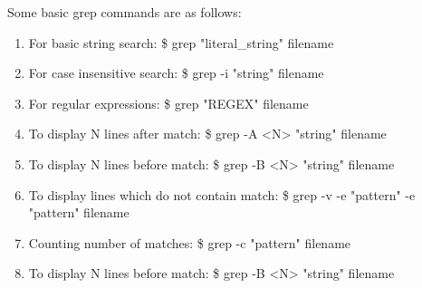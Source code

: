 \documentclass{beamer}
\begin{document}
\begin{frame}

Some basic grep commands are as follows:
\begin{enumerate}
    \item
        For basic string search:
            \$ grep "literal\_string" filename
    \item
        For case insensitive search:
            \$ grep -i "string" filename
    \item
        For regular expressions:
            \$ grep  "REGEX" filename
    \item
        To display N lines after match:
            \$ grep  -A <N> "string" filename
    \item
        To display N lines before match:
            \$ grep  -B <N> "string" filename
    \item
        To display lines which do not contain match:
            \$ grep  -v -e "pattern" -e "pattern" filename
    \item
        Counting number of matches:
            \$ grep  -c "pattern" filename
    \item
        To display N lines before match:
            \$ grep  -B <N> "string" filename
\end{enumerate}
\end{frame}
\end{document}

